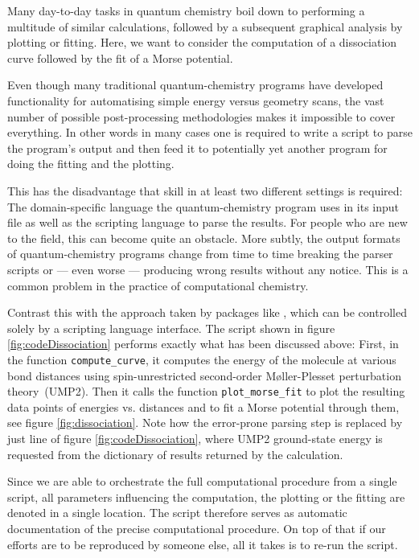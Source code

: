 Many day-to-day tasks in quantum chemistry boil down to
performing a multitude of similar calculations,
followed by a subsequent graphical analysis
by plotting or fitting.
Here, we want to consider the computation of a dissociation curve
followed by the fit of a Morse potential.

Even though many traditional quantum-chemistry programs
have developed functionality for automatising simple
energy versus geometry scans,
the vast number of possible post-processing methodologies
makes it impossible to cover everything.
In other words in many cases one is required to write a script
to parse the program's output and then feed it to potentially yet
another program for doing the fitting and the plotting.

This has the disadvantage
that skill in at least two different settings is required:
The domain-specific language the quantum-chemistry program uses
in its input file as well as the scripting language to parse the results.
For people who are new to the field, this can become quite an obstacle.
More subtly, the output formats
of quantum-chemistry programs change from time to time
breaking the parser scripts or --- even worse ---
producing wrong results without any notice.
This is a common problem in the practice of computational chemistry.

Contrast this with the approach taken by packages like \molsturm,
which can be controlled solely by a scripting language interface.
The \python script shown in figure \ref{fig:codeDissociation} performs
exactly what has been discussed above:
First, in the function \texttt{compute\_curve},
it computes the energy of the  molecule
at various bond distances using spin-unrestricted
second-order Møller-Plesset perturbation theory~(UMP2).
Then it calls the function \texttt{plot\_morse\_fit}
to plot the resulting data points of energies vs. distances
and to fit a Morse potential through them,
see figure \ref{fig:dissociation}.
Note how the error-prone parsing step is replaced by just
line \lextract of figure \ref{fig:codeDissociation},
where UMP2 ground-state energy is requested from the
dictionary of results returned by the calculation.

Since we are able to orchestrate the full computational procedure
from a single script,
all parameters influencing the computation, the plotting or the fitting
are denoted in a single location.
The script therefore serves as automatic documentation
of the precise computational procedure.
On top of that if our efforts are to be reproduced by someone else,
all it takes is to re-run the script.

